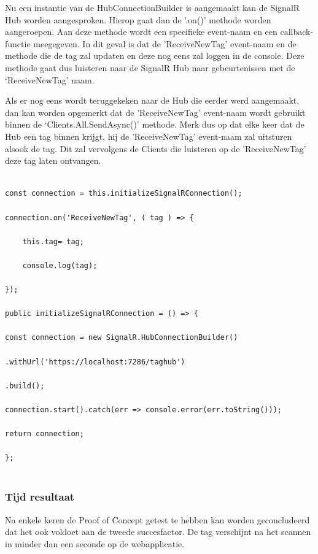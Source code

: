 Nu een instantie van de HubConnectionBuilder is aangemaakt kan de SignalR Hub worden aangesproken. Hierop gaat dan de '.on()' methode worden aangeroepen. Aan deze methode wordt een specifieke event-naam en een callback-functie meegegeven. In dit geval is dat de 'ReceiveNewTag’ event-naam en de methode die de tag zal updaten en deze nog eens zal loggen in de console. Deze methode gaat dus luisteren naar de SignalR Hub naar gebeurtenissen met de ‘ReceiveNewTag' naam. 

Als er nog eens wordt teruggekeken naar de Hub die eerder werd aangemaakt, dan kan worden opgemerkt dat de 'ReceiveNewTag’ event-naam wordt gebruikt binnen de ‘Clients.All.SendAsync()’ methode. Merk dus op dat elke keer dat de Hub een tag binnen krijgt, hij de 'ReceiveNewTag’ event-naam zal uitsturen alsook de tag. Dit zal vervolgens de Clients die luisteren op de 'ReceiveNewTag’ deze tag laten ontvangen.

\begin{verbatim} 
    
const connection = this.initializeSignalRConnection(); 

connection.on('ReceiveNewTag', ( tag ) => { 
    
    this.tag= tag; 
    
    console.log(tag); 
    
}); 

public initializeSignalRConnection = () => { 

const connection = new SignalR.HubConnectionBuilder() 

.withUrl('https://localhost:7286/taghub') 

.build(); 

connection.start().catch(err => console.error(err.toString())); 

return connection; 

}; 
    
\end{verbatim} 

\subsubsection{Tijd resultaat}
Na enkele keren de Proof of Concept getest te hebben kan worden geconcludeerd dat het ook voldoet aan de tweede succesfactor. De tag verschijnt na het scannen in minder dan een seconde op de webapplicatie.



